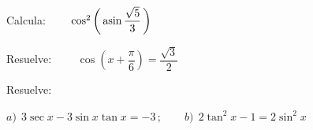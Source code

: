 \begin{mipropuesto}

 Calcula: $\qquad \cos^2 \left(\, \asin \dfrac{\sqrt{5}}{3} \, \right)$

\end{mipropuesto}

\vspace{-8mm}
\begin{flushright}
\begin{footnotesize} \textcolor{gris}{}	\end{footnotesize}
\end{flushright}


\begin{mipropuesto}

 Resuelve: $\qquad \cos \left( x+\dfrac \pi 6 \right)=\dfrac{\sqrt{3}}{2}$

\end{mipropuesto}

\vspace{-8mm}
\begin{flushright}
\begin{footnotesize} \textcolor{gris}{}	\end{footnotesize}
\end{flushright}


\begin{mipropuesto}

Resuelve:

\vspace{1mm} $a)\ \ 3\sec x-3\sin x\tan x=-3\, ; \qquad b)\ \ 2\tan^2 x-1=2\sin^2 x$	
\end{mipropuesto}

\vspace{-8mm}
\begin{flushright}
\begin{footnotesize} \textcolor{gris}{}	\end{footnotesize}
\end{flushright}




